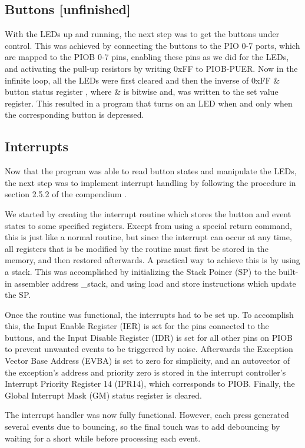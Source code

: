 \subsection*{Buttons [unfinished]}

With the LEDs up and running, the next step was to get the buttons under control. This was achieved by connecting the buttons to the PIO 0-7 ports, which are mapped to the PIOB 0-7 pins, enabling these pins as we did for the LEDs, and activating the pull-up resistors by writing 0xFF to PIOB-PUER. Now in the infinite loop, all the LEDs were first cleared and then the inverse of 0xFF \& {button status register} , where \& is bitwise and, was written to the {set value register}. This resulted in a program that turns on an LED when and only when the corresponding button is depressed.
\subsection*{Interrupts}

Now that the program was able to read button states and manipulate the LEDs, the next step was to implement interrupt handling by following the procedure in section 2.5.2 of the compendium \cite{kompendium}.

We started by creating the interrupt routine which stores the button and event states to some specified registers. Except from using a special return command, this is just like a normal routine, but since the interrupt can occur at any time, all registers that is be modified by the routine must first be stored in the memory, and then restored afterwards. A practical way to achieve this is by using a stack. This was accomplished by initializing the Stack Poiner (SP) to the built-in assembler address \_stack, and using load and store instructions which update the SP.

Once the routine was functional, the interrupts had to be set up. To accomplish this, the Input Enable Register (IER) is set for the pins connected to the buttons, and the Input Disable Register (IDR) is set for all other pins on PIOB to prevent unwanted events to be triggerred by noise. Afterwards the Exception Vector Base Address (EVBA) is set to zero for simplicity, and an autovector of the exception’s address and priority zero is stored in the interrupt controller’s Interrupt Priority Register 14 (IPR14), which corresponds to PIOB. Finally, the Global Interrupt Mask (GM) status register is cleared.

The interrupt handler was now fully functional. However, each press generated several events due to bouncing, so the final touch was to add debouncing by waiting for a short while before processing each event.
